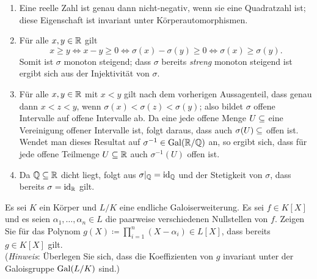 \begin{solution}
  \begin{enumerate}
    \item
      Eine reelle Zahl ist genau dann nicht-negativ, wenn sie eine Quadratzahl ist;
      diese Eigenschaft ist invariant unter Körperautomorphismen.
      
    \item
      Für alle $x, y \in \mathbb{R}$ gilt
      \[
              x \geq y
        \iff  x - y \geq 0
        \iff  \sigma(x) - \sigma(y) \geq 0
        \iff  \sigma(x) \geq \sigma(y).
      \]
      Somit ist $\sigma$ monoton steigend;
      dass $\sigma$ bereits \emph{streng} monoton steigend ist ergibt sich aus der Injektivität von $\sigma$.
      
    \item
      Für alle $x, y \in \mathbb{R}$ mit $x < y$ gilt nach dem vorherigen Aussagenteil, dass genau dann $x < z < y$, wenn 
      $\sigma(x) < \sigma(z) < \sigma(y)$; also bildet $\sigma$ offene Intervalle auf offene Intervalle ab.
      Da eine jede offene Menge $U \subseteq \real$ eine Vereinigung offener Intervalle ist, folgt daraus, dass auch $\sigma(U) \subseteq \real$ offen ist.
      Wendet man dieses Resultat auf $\sigma^{-1} \in \operatorname{Gal}(\mathbb{R}/\mathbb{Q})$ an, so ergibt sich, dass für jede offene Teilmenge $U \subseteq \mathbb{R}$ auch $\sigma^{-1}(U)$ offen ist.
    
    \item
      Da $\mathbb{Q} \subseteq \mathbb{R}$ dicht liegt, folgt aus $\sigma|_{\mathbb{Q}} = \operatorname{id}_{\mathbb{Q}}$ und der Stetigkeit von $\sigma$, dass bereits $\sigma = \operatorname{id}_{\mathbb{R}}$ gilt.
  \end{enumerate}
\end{solution}


\begin{question}
  Es sei $K$ ein Körper und $L/K$ eine endliche Galoiserweiterung.
  Es sei $f \in K[X]$ und es seien $\alpha_1, \dotsc, \alpha_n \in L$ die paarweise verschiedenen Nullstellen von $f$.
  Zeigen Sie für das Polynom $g(X) \coloneqq \prod_{i=1}^n (X - \alpha_i) \in L[X]$, dass bereits $g \in K[X]$ gilt.
  \\
  (\emph{Hinweis}:
   Überlegen Sie sich, dass die Koeffizienten von $g$ invariant unter der Galoisgruppe $\operatorname{Gal}(L/K)$ sind.)
\end{question}


